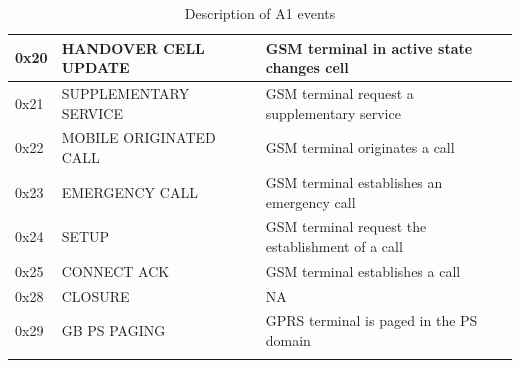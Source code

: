 \documentclass[master,english]{hgbthesis}
\begin{document}
{\begin{longtable}{|l|p{4cm}|p{8cm}|}
		0x20         & HANDOVER CELL UPDATE                 & GSM terminal in active state changes cell                                                                  \\ \hline

		0x21         & SUPPLEMENTARY SERVICE                & GSM terminal request a supplementary service                                                               \\ \hline

		0x22         & MOBILE ORIGINATED CALL               & GSM terminal originates a call                                                                             \\ \hline

		0x23         & EMERGENCY CALL                       & GSM terminal establishes an emergency call                                                                 \\ \hline

		0x24         & SETUP                                & GSM terminal request the establishment of a call                                                           \\ \hline

		0x25         & CONNECT ACK                          & GSM terminal establishes a call                                                                            \\ \hline

		0x28         & CLOSURE                              & NA                                                                                                         \\ \hline

		0x29         & GB PS PAGING                         & GPRS terminal is paged in the PS domain                                                                    \\ \hline

		\caption{Description of A1 events}

		\label{tab:eventtype}

	\end{longtable}}




\end{document}
